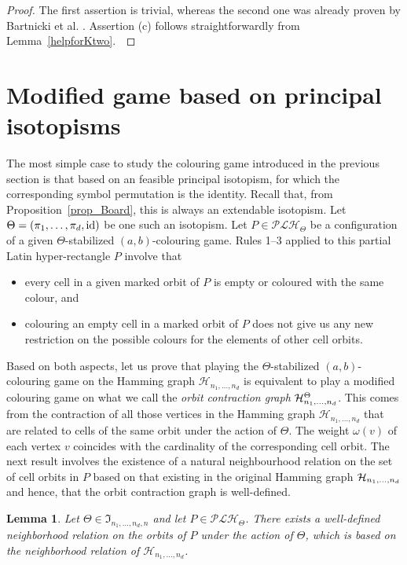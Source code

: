 \documentclass{article}
\newtheorem{lem}[thm]{Lemma}
\begin{document}
 \begin{proof} The first assertion is trivial, whereas the second one was already proven by Bartnicki et al. \cite{Bartnicki2008}. Assertion (c) follows straightforwardly from 
Lemma~\ref{helpforKtwo}.~\end{proof}

\section{Modified game based on principal isotopisms}\label{secmodifiedgame}

The most simple case to study the colouring game introduced in the previous section is that based on an feasible principal isotopism, for which the corresponding symbol permutation is the identity.  Recall that, from 
Proposition~\ref{prop_Board}, this is always an extendable isotopism. Let $\Theta=(\pi_1,\ldots,\pi_d,{\rm id})$ be one such an isotopism. Let $P\in\mathcal{PLH}_{\Theta}$ be a configuration of a given 
$\Theta$-stabilized $(a,b)$-colouring game. Rules 1--3 applied to this partial Latin hyper-rectangle $P$ involve that
\begin{itemize}
\item every cell in a given marked orbit of $P$ is empty or coloured with the same colour, and
\item colouring an empty cell in a marked orbit of $P$ does not give us any new restriction on the possible colours for the elements of other cell orbits.
\end{itemize}
Based on both aspects, let us prove that playing the $\Theta$-stabilized $(a,b)$-colouring game on the Hamming graph $\mathcal{H}_{n_1,\ldots,n_d}$ is equivalent to play a modified colouring game on what we call the \emph{orbit contraction graph} ${\cal H}_{n_1,\ldots,n_d}^{\Theta}$. This comes from the contraction of all those vertices in the Hamming graph $\mathcal{H}_{n_1,\ldots,n_d}$ that are related to cells of the same orbit under the action of $\Theta$. The weight $\omega(v)$ of each vertex $v$ coincides with the cardinality of the corresponding cell orbit. The next result involves the existence of a natural neighbourhood relation on the set of cell orbits in $P$ based on that existing in the original Hamming graph ${\cal H}_{n_1,\ldots,n_d}$ and hence, that the orbit contraction graph is well-defined.

\begin{lem}\label{neighborhoodwelldefined} Let $\Theta\in \mathfrak{I}_{n_1,\ldots,n_d,n}$ and let $P\in\mathcal{PLH}_{\Theta}$. There exists a well-defined neighborhood relation on the orbits of $P$ under the action of $\Theta$, which is based on the neighborhood relation of $\mathcal{H}_{n_1,\ldots,n_d}$.
\end{lem}
\end{document}
